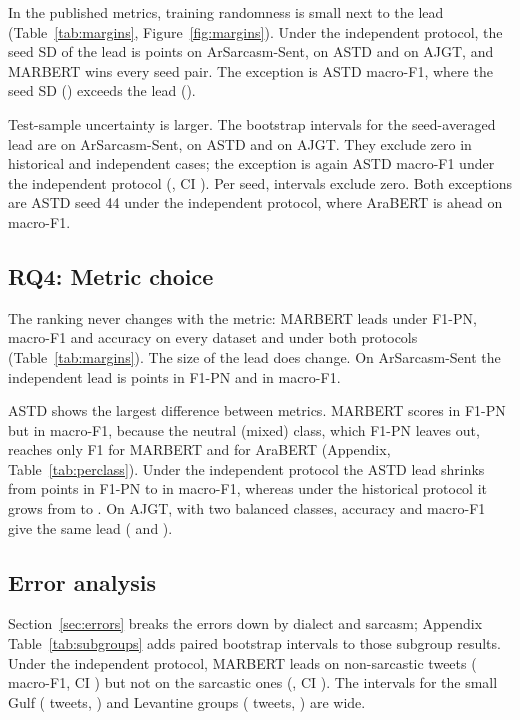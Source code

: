 In the published metrics, training randomness is small next to the lead (Table~\ref{tab:margins},
Figure~\ref{fig:margins}). Under the independent protocol, the seed SD of the lead is \rsMarginSDIndArSarcHm{}
points on ArSarcasm-Sent, \rsMarginSDIndAstdHm{} on ASTD and \rsMarginSDIndAjgtHm{} on AJGT, and MARBERT wins
every seed pair. The exception is ASTD macro-F1, where the seed SD (\rsMarginSDIndAstdMf{}) exceeds the lead
(\rsMarginIndAstdMf{}).

Test-sample uncertainty is larger. The bootstrap intervals for the seed-averaged lead are
\rsMarginCIIndArSarcHm{} on ArSarcasm-Sent, \rsMarginCIIndAstdHm{} on ASTD and \rsMarginCIIndAjgtHm{} on
AJGT. They exclude zero in \rsNCIExclZeroHist{} historical and \rsNCIExclZeroInd{} independent cases; the
exception is again ASTD macro-F1 under the independent protocol (\rsMarginIndAstdMf{}, CI \rsMarginCIIndAstdMf{}).
Per seed, \rsNPerSeedCIExclZero{} intervals exclude zero. Both exceptions are ASTD seed 44 under
the independent protocol, where AraBERT is ahead on macro-F1.

\subsection{RQ4: Metric choice}
\label{sec:results-rq4}

The ranking never changes with the metric: MARBERT leads under F1-PN, macro-F1 and accuracy on every
dataset and under both protocols (Table~\ref{tab:margins}). The size of the lead does change. On
ArSarcasm-Sent the independent lead is \rsMarginIndArSarcHm{} points in F1-PN and \rsMarginIndArSarcMf{} in
macro-F1.

ASTD shows the largest difference between metrics. MARBERT scores \rsIndHmAstdMarbert{} in F1-PN but
\rsIndMfAstdMarbert{} in macro-F1, because the neutral (mixed) class, which F1-PN leaves out, reaches only
\rsPcAstdMarbertNeutral{} F1 for MARBERT and \rsPcAstdArabertNeutral{} for AraBERT (Appendix,
Table~\ref{tab:perclass}). Under the independent protocol the ASTD lead shrinks from \rsMarginIndAstdHm{}
points in F1-PN to \rsMarginIndAstdMf{} in macro-F1, whereas under the historical protocol it grows from
\rsMarginHistAstdHm{} to \rsMarginHistAstdMf{}. On AJGT, with
two balanced classes, accuracy and macro-F1 give the same lead (\rsMarginIndAjgtHm{} and
\rsMarginIndAjgtMf{}).

\subsection{Error analysis}
\label{sec:results-errors}

Section~\ref{sec:errors} breaks the errors down by dialect and sarcasm; Appendix Table~\ref{tab:subgroups}
adds paired bootstrap intervals to those subgroup results. Under the independent protocol, MARBERT leads on
non-sarcastic tweets (\rsSubIndNonSarcMf{} macro-F1, CI \rsSubIndNonSarcMfCI{}) but not on the
\rsSubNSarc{} sarcastic ones (\rsSubIndSarcMf{}, CI \rsSubIndSarcMfCI{}). The intervals for the small Gulf
(\rsSubNGulf{} tweets, \rsSubIndGulfMfCI{}) and Levantine groups (\rsSubNLev{} tweets, \rsSubIndLevMfCI{})
are wide.
